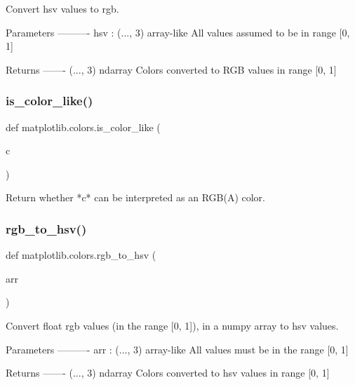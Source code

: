 \begin{DoxyVerb}Convert hsv values to rgb.

Parameters
----------
hsv : (..., 3) array-like
   All values assumed to be in range [0, 1]

Returns
-------
(..., 3) ndarray
   Colors converted to RGB values in range [0, 1]
\end{DoxyVerb}
 \mbox{\label{namespacematplotlib_1_1colors_a084095e38ce77a939da7c30a11a7c8d6}} 
\subsubsection{\texorpdfstring{is\+\_\+color\+\_\+like()}{is\_color\_like()}}
{\footnotesize\ttfamily def matplotlib.\+colors.\+is\+\_\+color\+\_\+like (\begin{DoxyParamCaption}\item[{}]{c }\end{DoxyParamCaption})}

\begin{DoxyVerb}Return whether *c* can be interpreted as an RGB(A) color.\end{DoxyVerb}
 \mbox{\label{namespacematplotlib_1_1colors_a2a8467e4e5d3ac2adce68fe3b9418d2c}} 
\subsubsection{\texorpdfstring{rgb\+\_\+to\+\_\+hsv()}{rgb\_to\_hsv()}}
{\footnotesize\ttfamily def matplotlib.\+colors.\+rgb\+\_\+to\+\_\+hsv (\begin{DoxyParamCaption}\item[{}]{arr }\end{DoxyParamCaption})}

\begin{DoxyVerb}Convert float rgb values (in the range [0, 1]), in a numpy array to hsv
values.

Parameters
----------
arr : (..., 3) array-like
   All values must be in the range [0, 1]

Returns
-------
(..., 3) ndarray
   Colors converted to hsv values in range [0, 1]
\end{DoxyVerb}
 \mbox{\label{namespacematplotlib_1_1colors_a61a26a45c36f62237abf3b79dd36befb}} 
